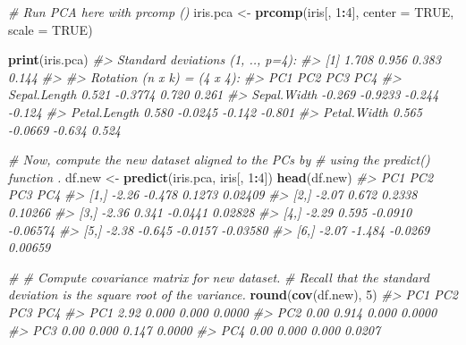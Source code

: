 \documentclass[]{book}
\newenvironment{Shaded}{\begin{snugshade}}{\end{snugshade}}
\newcommand{\CommentTok}[1]{\textcolor[rgb]{0.56,0.35,0.01}{\textit{#1}}}
\newcommand{\DataTypeTok}[1]{\textcolor[rgb]{0.13,0.29,0.53}{#1}}
\newcommand{\DecValTok}[1]{\textcolor[rgb]{0.00,0.00,0.81}{#1}}
\newcommand{\KeywordTok}[1]{\textcolor[rgb]{0.13,0.29,0.53}{\textbf{#1}}}
\newcommand{\NormalTok}[1]{#1}
\newcommand{\OperatorTok}[1]{\textcolor[rgb]{0.81,0.36,0.00}{\textbf{#1}}}
\newcommand{\OtherTok}[1]{\textcolor[rgb]{0.56,0.35,0.01}{#1}}
\newcommand{\StringTok}[1]{\textcolor[rgb]{0.31,0.60,0.02}{#1}}
\begin{document}
\begin{Shaded}
\begin{Highlighting}[]
\CommentTok{# Run PCA here with prcomp ()}
\NormalTok{iris.pca <-}\StringTok{ }\KeywordTok{prcomp}\NormalTok{(iris[, }\DecValTok{1}\OperatorTok{:}\DecValTok{4}\NormalTok{], }\DataTypeTok{center =} \OtherTok{TRUE}\NormalTok{, }\DataTypeTok{scale =} \OtherTok{TRUE}\NormalTok{)}

\KeywordTok{print}\NormalTok{(iris.pca)}
\CommentTok{#> Standard deviations (1, .., p=4):}
\CommentTok{#> [1] 1.708 0.956 0.383 0.144}
\CommentTok{#> }
\CommentTok{#> Rotation (n x k) = (4 x 4):}
\CommentTok{#>                 PC1     PC2    PC3    PC4}
\CommentTok{#> Sepal.Length  0.521 -0.3774  0.720  0.261}
\CommentTok{#> Sepal.Width  -0.269 -0.9233 -0.244 -0.124}
\CommentTok{#> Petal.Length  0.580 -0.0245 -0.142 -0.801}
\CommentTok{#> Petal.Width   0.565 -0.0669 -0.634  0.524}
\end{Highlighting}
\end{Shaded}

\begin{Shaded}
\begin{Highlighting}[]
\CommentTok{# Now, compute the new dataset aligned to the PCs by}
\CommentTok{# using the predict() function .}
\NormalTok{df.new <-}\StringTok{ }\KeywordTok{predict}\NormalTok{(iris.pca, iris[, }\DecValTok{1}\OperatorTok{:}\DecValTok{4}\NormalTok{])}
\KeywordTok{head}\NormalTok{(df.new)}
\CommentTok{#>        PC1    PC2     PC3      PC4}
\CommentTok{#> [1,] -2.26 -0.478  0.1273  0.02409}
\CommentTok{#> [2,] -2.07  0.672  0.2338  0.10266}
\CommentTok{#> [3,] -2.36  0.341 -0.0441  0.02828}
\CommentTok{#> [4,] -2.29  0.595 -0.0910 -0.06574}
\CommentTok{#> [5,] -2.38 -0.645 -0.0157 -0.03580}
\CommentTok{#> [6,] -2.07 -1.484 -0.0269  0.00659}
\end{Highlighting}
\end{Shaded}

\begin{Shaded}
\end{Shaded}

\begin{Shaded}
\begin{Highlighting}[]
\CommentTok{# # Compute covariance matrix for new dataset.}
\CommentTok{# Recall that the standard deviation is the square root of the variance.}
\KeywordTok{round}\NormalTok{(}\KeywordTok{cov}\NormalTok{(df.new), }\DecValTok{5}\NormalTok{)}
\CommentTok{#>      PC1   PC2   PC3    PC4}
\CommentTok{#> PC1 2.92 0.000 0.000 0.0000}
\CommentTok{#> PC2 0.00 0.914 0.000 0.0000}
\CommentTok{#> PC3 0.00 0.000 0.147 0.0000}
\CommentTok{#> PC4 0.00 0.000 0.000 0.0207}
\end{Highlighting}
\end{Shaded}
\end{document}
